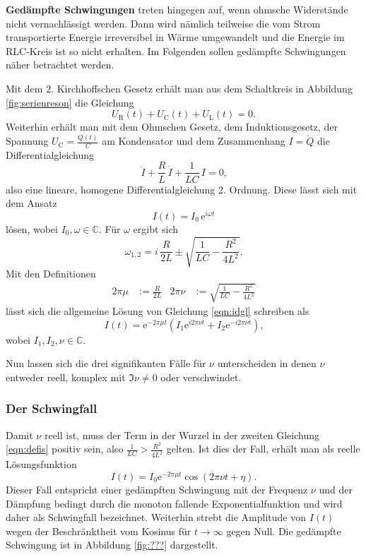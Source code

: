 \textbf{Gedämpfte Schwingungen} treten hingegen auf, wenn ohmsche Widerstände nicht vernachlässigt werden.
Dann wird nämlich teilweise die vom Strom transportierte Energie irreversibel in Wärme
umgewandelt und die Energie im RLC-Kreis ist so nicht erhalten. Im Folgenden sollen gedämpfte
Schwingungen näher betrachtet werden.

Mit dem 2. Kirchhoffschen Gesetz erhält man aus dem Schaltkreis in Abbildung \ref{fig:serienreson} die Gleichung
\begin{equation*}
	U_{\text{R}}(t) + U_{\text{C}}(t) + U_{\text{L}}(t) = 0 \text{.}
\end{equation*}
Weiterhin erhält man mit dem Ohmschen Gesetz, dem Induktionsgesetz, der Spannung $U_{\text{C}} = \frac{Q(t)}{C}$ am Kondensator und dem Zusammenhang $I = \dot{Q}$ die Differentialgleichung
\begin{equation}
	\ddot{I} + \frac{R}{L} \, \dot{I} + \frac{1}{LC} \, I = 0 \text{,}
	\label{eqn:idgl}
\end{equation}
also eine lineare, homogene Differentialgleichung 2. Ordnung.
Diese lässt sich mit dem Ansatz
\begin{equation}
	I(t) = I_0 \, \mathrm{e}^{i \omega t}
\end{equation}
lösen, wobei $I_0, \omega \in \mathbb{C}$.
Für $\omega$ ergibt sich
\begin{equation}
	\omega_{1,2} = i \, \frac{R}{2L} \pm \sqrt{\frac{1}{LC} - \frac{R^2}{4L^2}} \text{.}
\end{equation}
Mit den Definitionen
\begin{align}
	2 \pi \mu &:= \frac{R}{2L} & 2 \pi \nu &:= \sqrt{\frac{1}{LC} - \frac{R^2}{4L^2}}
	\label{eqn:defis}
\end{align}
lässt sich die allgemeine Lösung von Gleichung \eqref{eqn:idgl} schreiben als
\begin{equation}
	I(t) = \mathrm{e}^{-2 \pi \mu t} (I_1 \mathrm{e}^{i 2 \pi \nu t} + I_2 \mathrm{e}^{-i 2 \pi \nu t}) \text{,}
\end{equation}
wobei $I_1, I_2, \nu \in \mathbb{C}$.

Nun lassen sich die drei signifikanten Fälle für $\nu$ unterscheiden in denen $\nu$ entweder reell, komplex mit $\Im \nu \neq 0$ oder verschwindet.

\subsubsection{Der Schwingfall}
Damit $\nu$ reell ist, muss der Term in der Wurzel in der zweiten Gleichung \eqref{eqn:defis}
positiv sein, also $\frac{1}{LC} > \frac{R^2}{4L^2}$ gelten.
Ist dies der Fall, erhält man als reelle Lösungsfunktion
\begin{equation}
	I(t) = I_0 \mathrm{e}^{-2 \pi \mu t} \cos(2\pi \nu t + \eta) \text{.}
	\label{eqn:schwingi}
\end{equation}
Dieser Fall entspricht einer gedämpften Schwingung mit der Frequenz $\nu$ und der Dämpfung
bedingt durch die monoton fallende Exponentialfunktion und wird daher als Schwingfall bezeichnet.
Weiterhin strebt die Amplitude von $I(t)$ wegen der Beschränktheit vom Kosinus für $t \to \infty$ gegen Null.
Die gedämpfte Schwingung ist in Abbildung \ref{fig:???} dargestellt.

